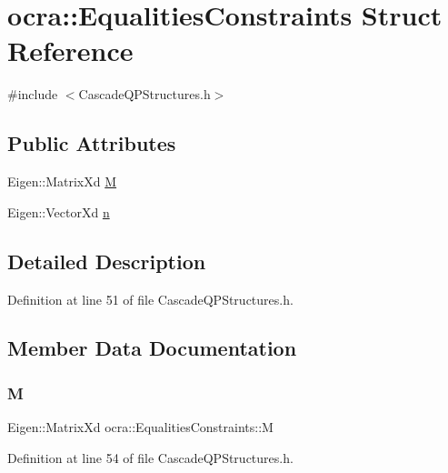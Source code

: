 \hypertarget{structocra_1_1EqualitiesConstraints}{}\section{ocra\+:\+:Equalities\+Constraints Struct Reference}
\label{structocra_1_1EqualitiesConstraints}


{\ttfamily \#include $<$Cascade\+Q\+P\+Structures.\+h$>$}

\subsection*{Public Attributes}
\begin{DoxyCompactItemize}
\item 
Eigen\+::\+Matrix\+Xd \hyperlink{structocra_1_1EqualitiesConstraints_a948420ad39defa889f402d30041a3521}{M}
\item 
Eigen\+::\+Vector\+Xd \hyperlink{structocra_1_1EqualitiesConstraints_a03425f2d5d16dbb6a0c7da036a2fee77}{n}
\end{DoxyCompactItemize}


\subsection{Detailed Description}


Definition at line 51 of file Cascade\+Q\+P\+Structures.\+h.



\subsection{Member Data Documentation}
\hypertarget{structocra_1_1EqualitiesConstraints_a948420ad39defa889f402d30041a3521}{}\label{structocra_1_1EqualitiesConstraints_a948420ad39defa889f402d30041a3521} 
\subsubsection{\texorpdfstring{M}{M}}
{\footnotesize\ttfamily Eigen\+::\+Matrix\+Xd ocra\+::\+Equalities\+Constraints\+::M}



Definition at line 54 of file Cascade\+Q\+P\+Structures.\+h.

\hypertarget{structocra_1_1EqualitiesConstraints_a03425f2d5d16dbb6a0c7da036a2fee77}{}\label{structocra_1_1EqualitiesConstraints_a03425f2d5d16dbb6a0c7da036a2fee77} 
